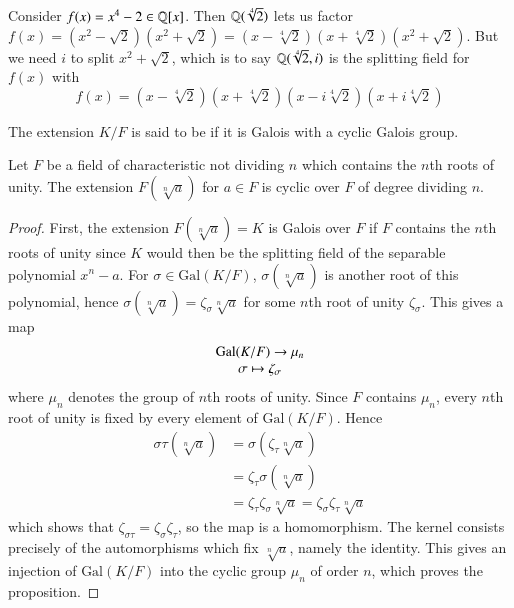 \begin{eg}
    Consider $f(x) = x^4 - 2 \in \mathbb Q[x]$. Then $\mathbb Q(\sqrt[4]{2})$ lets us factor $f(x) = (x^2-\sqrt{2})(x^2+\sqrt{2}) = (x-\sqrt[4]{2})(x+\sqrt[4]{2})(x^2+\sqrt{2})$. But we need $i$ to split $x^2+\sqrt{2}$, which is to say $\mathbb Q(\sqrt[4]{2},i)$ is the splitting field for $f(x)$ with \begin{equation*}
        f(x) = (x-\sqrt[4]{2})(x+\sqrt[4]{2})(x-i\sqrt[4]{2})(x+i\sqrt[4]{2})
    \end{equation*}
\end{eg}

\begin{defn}
    The extension $K/F$ is said to be  if it is Galois with a cyclic Galois group.
\end{defn}


\begin{prop}
    Let $F$ be a field of characteristic not dividing $n$ which contains the $n$th roots of unity. The extension $F(\sqrt[n]{a})$ for $a \in F$ is cyclic over $F$ of degree dividing $n$.
\end{prop}
\begin{proof}
    First, the extension $F(\sqrt[n]{a}) = K$ is Galois over $F$ if $F$ contains the $n$th roots of unity since $K$ would then be the splitting field of the separable polynomial $x^n - a$. For $\sigma \in \text{Gal}(K/F)$, $\sigma(\sqrt[n]{a})$ is another root of this polynomial, hence $\sigma(\sqrt[n]{a}) = \zeta_{\sigma}\sqrt[n]{a}$ for some $n$th root of unity $\zeta_{\sigma}$. This gives a map \begin{equation*}
        \begin{array}{c} \text{Gal}(K/F)\rightarrow \mu_n \\ \sigma\mapsto \zeta_{\sigma} \end{array}
    \end{equation*}
    where $\mu_n$ denotes the group of $n$th roots of unity. Since $F$ contains $\mu_n$, every $n$th root of unity is fixed by every element of $\text{Gal}(K/F)$. Hence \begin{align*}
        \sigma\tau(\sqrt[n]{a}) &= \sigma(\zeta_{\tau}\sqrt[n]{a}) \\
        &= \zeta_{\tau}\sigma(\sqrt[n]{a}) \\
        &= \zeta_{\tau}\zeta_{\sigma}\sqrt[n]{a} = \zeta_{\sigma}\zeta_{\tau}\sqrt[n]{a}
    \end{align*}
    which shows that $\zeta_{\sigma\tau} = \zeta_{\sigma}\zeta_{\tau}$, so the map is a homomorphism. The kernel consists precisely of the automorphisms which fix $\sqrt[n]{a}$, namely the identity. This gives an injection of $\text{Gal}(K/F)$ into the cyclic group $\mu_n$ of order $n$, which proves the proposition.
\end{proof}

